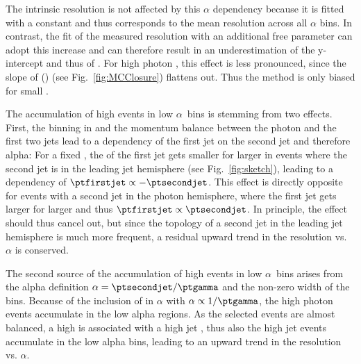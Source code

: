 The intrinsic resolution is not affected by this $\alpha$ dependency because it is fitted with a constant and thus corresponds to the mean resolution across all $\alpha$ bins.
In contrast, the fit of the measured resolution with an additional free parameter can adopt this increase and can therefore result in an underestimation of the y-intercept and thus of \jer. 
For high photon \pt, this effect is less pronounced, since the slope of \jer(\ptgamma) (see Fig.~\ref{fig:MCClosure}) flattens out. Thus the method is only biased for small \ptgamma.

The accumulation of high \ptfirstjet events in low $\alpha$~bins is stemming from two effects.
First, the binning in \ptgamma and the momentum balance between the photon and the first two jets lead to a dependency of the first jet \pt on the second jet \pt and therefore alpha: 
For a fixed \ptgamma, the \pt of the first jet gets smaller for larger \ptsecondjet in events where the second jet is in the leading jet hemisphere (see Fig.~\ref{fig:sketch}), 
leading to a dependency of $\ptfirstjet \propto -\ptsecondjet$.
This effect is directly opposite for events with a second jet in the photon hemisphere, where the first jet \pt gets larger for larger \ptsecondjet and thus $\ptfirstjet \propto \ptsecondjet$. 
In principle, the effect should thus cancel out, but since the topology of a second jet in the leading jet hemisphere is much more frequent, a residual upward trend in the resolution vs. $\alpha$ is conserved. 

The second source of the accumulation of high \ptfirstjet events in low $\alpha$~bins arises from the alpha definition $\alpha = \ptsecondjet/\ptgamma$ and the non-zero width of the \ptgamma bins. 
Because of the inclusion of \ptgamma in $\alpha$ with $\alpha \propto 1/\ptgamma$, the high photon \pt events accumulate in the low alpha regions. 
As the selected events are almost balanced, a high \ptgamma is associated with a high jet \pt, thus also the high jet \pt events accumulate in the low alpha bins, leading to  an upward trend in the resolution vs. $\alpha$. \\

